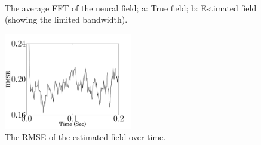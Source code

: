 \documentclass[12pt]{iopart}
\begin{document}
\label{fig:ParametersRatio}
\begin{figure}[th]
\label{fig:FieldFFT}
\label{fig:EstimatedFieldFFT}\\
\caption{The average FFT of the neural field; a: True field; b: Estimated field (showing the limited bandwidth).}
\label{fig:FFTTrueEstimate}
\end{figure}

  \begin{figure}
   	\begin{center}
   		\includegraphics[width=0.5\textwidth]{./Graph/MRMSE.pdf} 
   	\end{center}
   	\caption{The RMSE of the estimated field over time.} 
\label{fig:RMSE}
   \end{figure}
\end{document}
